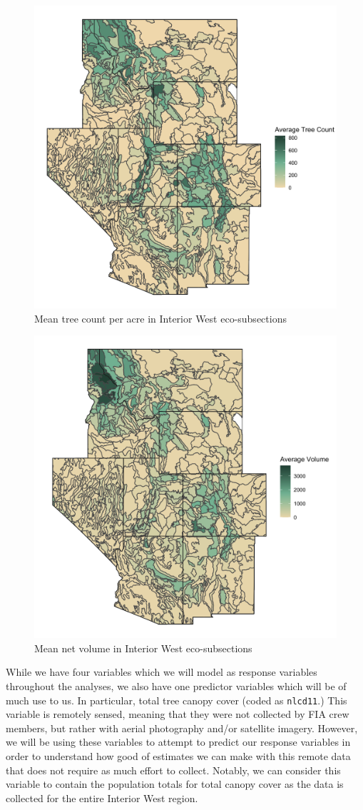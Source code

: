 \documentclass[12pt,twoside]{reedthesis}
\begin{document}
\begin{figure}

{\centering \includegraphics[width=0.65\linewidth]{figure/count} 

}

\caption{Mean tree count per acre in Interior West eco-subsections}\label{fig:unnamed-chunk-7}
\end{figure}
\begin{figure}

{\centering \includegraphics[width=0.65\linewidth]{figure/voln} 

}

\caption{Mean net volume in Interior West eco-subsections}\label{fig:unnamed-chunk-8}
\end{figure}
While we have four variables which we will model as response variables throughout the analyses, we also have one predictor variables which will be of much use to us. In particular, total tree canopy cover (coded as \texttt{nlcd11}.) This variable is remotely sensed, meaning that they were not collected by FIA crew members, but rather with aerial photography and/or satellite imagery. However, we will be using these variables to attempt to predict our response variables in order to understand how good of estimates we can make with this remote data that does not require as much effort to collect. Notably, we can consider this variable to contain the population totals for total canopy cover as the data is collected for the entire Interior West region.
\end{document}
